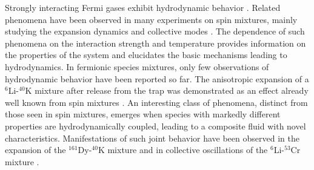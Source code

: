 Strongly interacting Fermi gases exhibit hydrodynamic behavior \cite{Varenna2006book, Giorgini2008tou}. Related phenomena have been observed in many experiments on spin mixtures, mainly studying the expansion dynamics \cite{Giorgini2008tou, Ohara2002ooa}
and collective modes \cite{Kinast2004efs, Bartenstein2004ceo, Altmeyer2007doa, Wright2007ftc, Nascimbene2009coo, Tey2013cmi}.
The dependence of such phenomena on the interaction strength and temperature provides information on the properties of the system and elucidates the basic mechanisms leading to hydrodynamics.
In fermionic species mixtures, only few observations of hydrodynamic behavior have been reported so far. The anisotropic expansion of a $^6$Li-$^{40}$K mixture after release from the trap \cite{Trenkwalder2011heo} was demonstrated as an effect already well known from spin mixtures \cite{Ohara2002ooa}. 
An interesting class of phenomena, distinct from those seen in spin mixtures, emerges when species with markedly different properties are hydrodynamically coupled, leading to a composite fluid with novel characteristics.
Manifestations of such joint behavior have been observed in the expansion of the $^{161}$Dy-$^{40}$K mixture \cite{Ravensbergen2020rif} and in collective oscillations of the $^6$Li-$^{53}$Cr mixture \cite{Finelli2024ula}.

